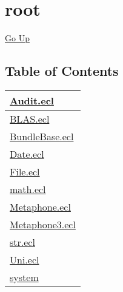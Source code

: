\chapter*{\color{headtoc} root}
\hypertarget{ecldoc:toc:root}{}
\hyperlink{ecldoc:toc:}{Go Up}


\section*{Table of Contents}
{\renewcommand{\arraystretch}{1.5}
\begin{longtable}{|p{\textwidth}|}
\hline
\hyperlink{ecldoc:toc:Audit}{Audit.ecl} \\
\hline
\hyperlink{ecldoc:toc:BLAS}{BLAS.ecl} \\
\hline
\hyperlink{ecldoc:toc:BundleBase}{BundleBase.ecl} \\
\hline
\hyperlink{ecldoc:toc:Date}{Date.ecl} \\
\hline
\hyperlink{ecldoc:toc:File}{File.ecl} \\
\hline
\hyperlink{ecldoc:toc:math}{math.ecl} \\
\hline
\hyperlink{ecldoc:toc:Metaphone}{Metaphone.ecl} \\
\hline
\hyperlink{ecldoc:toc:Metaphone3}{Metaphone3.ecl} \\
\hline
\hyperlink{ecldoc:toc:str}{str.ecl} \\
\hline
\hyperlink{ecldoc:toc:Uni}{Uni.ecl} \\
\hline
\hyperlink{ecldoc:toc:root/system}{system} \\
\hline
\end{longtable}
}












